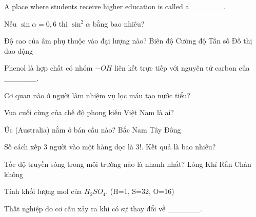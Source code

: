 \begin{ex}
    A place where students receive higher education is called a ______.
\end{ex}
\begin{ex}
    Nếu $\sin \alpha = 0,6$ thì $\sin^2 \alpha$ bằng bao nhiêu?
\end{ex}
\begin{ex}
    Độ cao của âm phụ thuộc vào đại lượng nào?
    \choice
    {Biên độ}
    {Cường độ}
    {\True Tần số}
    {Đồ thị dao động}
\end{ex}
\begin{ex}
    Phenol là hợp chất có nhóm $-OH$ liên kết trực tiếp với nguyên tử carbon của ______.
\end{ex}
\begin{ex}
    Cơ quan nào ở người làm nhiệm vụ lọc máu tạo nước tiểu?
\end{ex}
\begin{ex}
    Vua cuối cùng của chế độ phong kiến Việt Nam là ai?
\end{ex}
\begin{ex}
    Úc (Australia) nằm ở bán cầu nào?
    \choice
    {Bắc}
    {\True Nam}
    {Tây}
    {Đông}
\end{ex}
\begin{ex}
    Số cách xếp 3 người vào một hàng dọc là $3!$. Kết quả là bao nhiêu?
\end{ex}
\begin{ex}
    Tốc độ truyền sóng trong môi trường nào là nhanh nhất?
    \choice
    {Lỏng}
    {Khí}
    {\True Rắn}
    {Chân không}
\end{ex}
\begin{ex}
    Tính khối lượng mol của $H_2SO_4$. (H=1, S=32, O=16)
\end{ex}
\begin{ex}
    Thất nghiệp do cơ cấu xảy ra khi có sự thay đổi về ______.
\end{ex}
